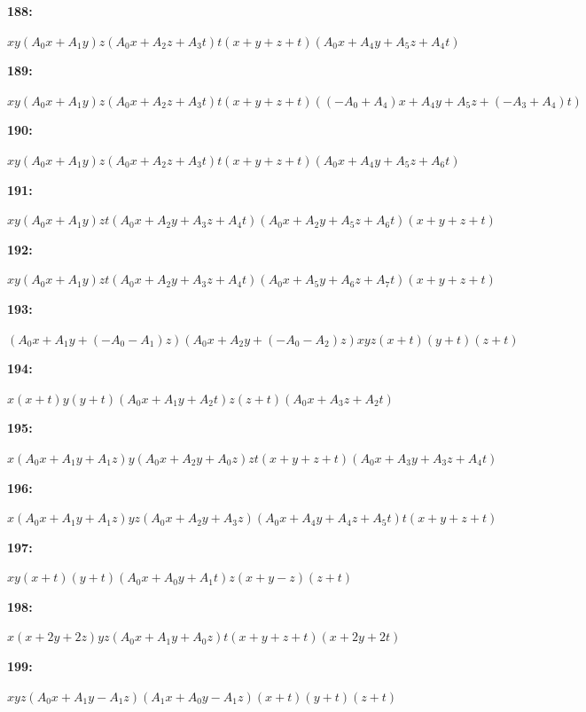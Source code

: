 \documentclass[12pt]{amsart}
\theoremstyle{plain}
\theoremstyle{remark}
\theoremstyle{definition}
\numberwithin{table}{section}
\begin{document}
\noindent\parbox[right]{9mm}{\textbf{188:}}\parbox{3mm}{\hfill}%
\parbox[t]{15cm}{\(xy(A_{0}x + A_{1}y)z(A_{0}x + A_{2}z + A_{3}t)t(x + y + z + t)(A_{0}x + A_{4}y + A_{5}z + A_{4}t)\)}

\noindent\parbox[right]{9mm}{\textbf{189:}}\parbox{3mm}{\hfill}%
\parbox[t]{15cm}{\(xy(A_{0}x + A_{1}y)z(A_{0}x + A_{2}z + A_{3}t)t(x + y + z + t)((-A_{0} + A_{4})x + A_{4}y + A_{5}z + (-A_{3} + A_{4})t)\)}

\noindent\parbox[right]{9mm}{\textbf{190:}}\parbox{3mm}{\hfill}%
\parbox[t]{15cm}{\(xy(A_{0}x + A_{1}y)z(A_{0}x + A_{2}z + A_{3}t)t(x + y + z + t)(A_{0}x + A_{4}y + A_{5}z + A_{6}t)\)}

\noindent\parbox[right]{9mm}{\textbf{191:}}\parbox{3mm}{\hfill}%
\parbox[t]{15cm}{\(xy(A_{0}x + A_{1}y)zt(A_{0}x + A_{2}y + A_{3}z + A_{4}t)(A_{0}x + A_{2}y + A_{5}z + A_{6}t)(x + y + z + t)\)}

\noindent\parbox[right]{9mm}{\textbf{192:}}\parbox{3mm}{\hfill}%
\parbox[t]{15cm}{\(xy(A_{0}x + A_{1}y)zt(A_{0}x + A_{2}y + A_{3}z + A_{4}t)(A_{0}x + A_{5}y + A_{6}z + A_{7}t)(x + y + z + t)\)}

\noindent\parbox[right]{9mm}{\textbf{193:}}\parbox{3mm}{\hfill}%
\parbox[t]{15cm}{\((A_{0}x + A_{1}y + (-A_{0} - A_{1})z)(A_{0}x + A_{2}y + (-A_{0} - A_{2})z)xyz(x + t)(y + t)(z + t)\)}

\noindent\parbox[right]{9mm}{\textbf{194:}}\parbox{3mm}{\hfill}%
\parbox[t]{15cm}{\(x(x + t)y(y + t)(A_{0}x + A_{1}y + A_{2}t)z(z + t)(A_{0}x + A_{3}z + A_{2}t)\)}

\noindent\parbox[right]{9mm}{\textbf{195:}}\parbox{3mm}{\hfill}%
\parbox[t]{15cm}{\(x(A_{0}x + A_{1}y + A_{1}z)y(A_{0}x + A_{2}y + A_{0}z)zt(x + y + z + t)(A_{0}x + A_{3}y + A_{3}z + A_{4}t)\)}

\noindent\parbox[right]{9mm}{\textbf{196:}}\parbox{3mm}{\hfill}%
\parbox[t]{15cm}{\(x(A_{0}x + A_{1}y + A_{1}z)yz(A_{0}x + A_{2}y + A_{3}z)(A_{0}x + A_{4}y + A_{4}z + A_{5}t)t(x + y + z + t)\)}

\noindent\parbox[right]{9mm}{\textbf{197:}}\parbox{3mm}{\hfill}%
\parbox[t]{15cm}{\(xy(x + t)(y + t)(A_{0}x + A_{0}y + A_{1}t)z(x + y - z)(z + t)\)}

\noindent\parbox[right]{9mm}{\textbf{198:}}\parbox{3mm}{\hfill}%
\parbox[t]{15cm}{\(x(x + 2y + 2z)yz(A_{0}x + A_{1}y + A_{0}z)t(x + y + z + t)(x + 2y + 2t)\)}

\noindent\parbox[right]{9mm}{\textbf{199:}}\parbox{3mm}{\hfill}%
\parbox[t]{15cm}{\(xyz(A_{0}x + A_{1}y - A_{1}z)(A_{1}x + A_{0}y - A_{1}z)(x + t)(y + t)(z + t)\)}
\end{document}
